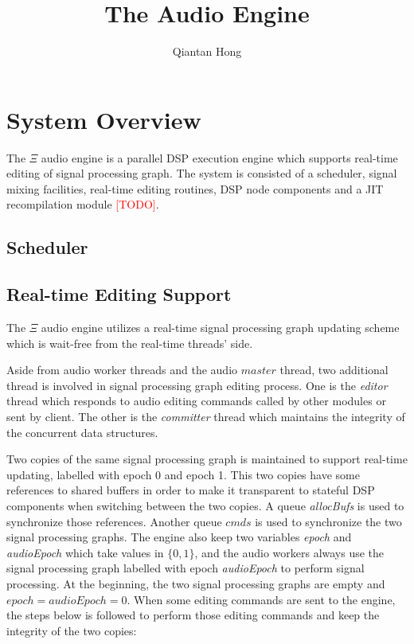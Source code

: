 \documentclass{report}
\title{The \Ksi Audio Engine}
\author{Qiantan Hong}
\newcommand{\Ksi}{$\Xi$ }
\newcommand{\todo}{\textcolor{red}{[TODO]}}
\begin{document}
\maketitle
\chapter{System Overview}
The \Ksi audio engine is a parallel DSP execution engine which supports real-time editing of signal processing graph. The system is consisted of a scheduler, signal mixing facilities, real-time editing routines, DSP node components and a JIT recompilation module \todo.
\section{Scheduler}
\section{Real-time Editing Support}
The \Ksi audio engine utilizes a real-time signal processing graph updating scheme which is wait-free from the real-time threads' side.\par
Aside from audio worker threads and the audio $master$ thread, two additional thread is involved in signal processing graph editing process. One is the \emph{editor} thread which responds to audio editing commands called by other modules or sent by client. The other is the \emph{committer} thread which maintains the integrity of the concurrent data structures.\par
Two copies of the same signal processing graph is maintained to support real-time updating, labelled with epoch 0 and epoch 1. This two copies have some references to shared buffers in order to make it transparent to stateful DSP components when switching between the two copies. A queue \emph{allocBufs} is used to synchronize those references. Another queue $cmds$ is used to synchronize the two signal processing graphs. The engine also keep two variables \emph{epoch} and \emph{audioEpoch} which take values in $\{0,1\}$, and the audio workers always use the signal processing graph labelled with epoch \emph{audioEpoch} to perform signal processing. At the beginning, the two signal processing graphs are empty and $epoch=audioEpoch=0$. When some editing commands are sent to the engine, the steps below is followed to perform those editing commands and keep the integrity of the two copies:
\end{document}
